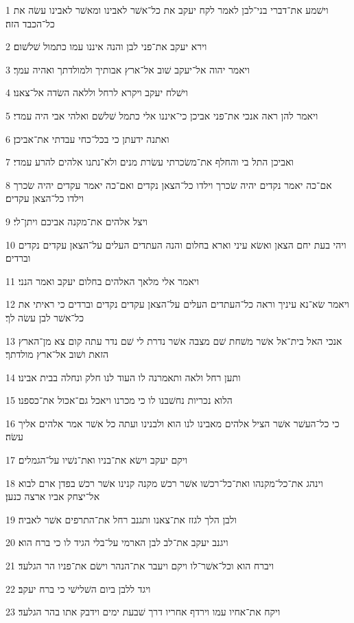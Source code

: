 \par 1 וישׁמע את־דברי בני־לבן לאמר לקח יעקב את כל־אשׁר לאבינו ומאשׁר לאבינו עשׂה את כל־הכבד הזה׃
\par 2 וירא יעקב את־פני לבן והנה איננו עמו כתמול שׁלשׁום׃
\par 3 ויאמר יהוה אל־יעקב שׁוב אל־ארץ אבותיך ולמולדתך ואהיה עמך׃
\par 4 וישׁלח יעקב ויקרא לרחל וללאה השׂדה אל־צאנו׃
\par 5 ויאמר להן ראה אנכי את־פני אביכן כי־איננו אלי כתמל שׁלשׁם ואלהי אבי היה עמדי׃
\par 6 ואתנה ידעתן כי בכל־כחי עבדתי את־אביכן׃
\par 7 ואביכן התל בי והחלף את־משׂכרתי עשׂרת מנים ולא־נתנו אלהים להרע עמדי׃
\par 8 אם־כה יאמר נקדים יהיה שׂכרך וילדו כל־הצאן נקדים ואם־כה יאמר עקדים יהיה שׂכרך וילדו כל־הצאן עקדים׃
\par 9 ויצל אלהים את־מקנה אביכם ויתן־לי׃
\par 10 ויהי בעת יחם הצאן ואשׂא עיני וארא בחלום והנה העתדים העלים על־הצאן עקדים נקדים וברדים׃
\par 11 ויאמר אלי מלאך האלהים בחלום יעקב ואמר הנני׃
\par 12 ויאמר שׂא־נא עיניך וראה כל־העתדים העלים על־הצאן עקדים נקדים וברדים כי ראיתי את כל־אשׁר לבן עשׂה לך׃
\par 13 אנכי האל בית־אל אשׁר משׁחת שׁם מצבה אשׁר נדרת לי שׁם נדר עתה קום צא מן־הארץ הזאת ושׁוב אל־ארץ מולדתך׃
\par 14 ותען רחל ולאה ותאמרנה לו העוד לנו חלק ונחלה בבית אבינו׃
\par 15 הלוא נכריות נחשׁבנו לו כי מכרנו ויאכל גם־אכול את־כספנו׃
\par 16 כי כל־העשׁר אשׁר הציל אלהים מאבינו לנו הוא ולבנינו ועתה כל אשׁר אמר אלהים אליך עשׂה׃
\par 17 ויקם יעקב וישׂא את־בניו ואת־נשׁיו על־הגמלים׃
\par 18 וינהג את־כל־מקנהו ואת־כל־רכשׁו אשׁר רכשׁ מקנה קנינו אשׁר רכשׁ בפדן ארם לבוא אל־יצחק אביו ארצה כנען׃
\par 19 ולבן הלך לגזז את־צאנו ותגנב רחל את־התרפים אשׁר לאביה׃
\par 20 ויגנב יעקב את־לב לבן הארמי על־בלי הגיד לו כי ברח הוא׃
\par 21 ויברח הוא וכל־אשׁר־לו ויקם ויעבר את־הנהר וישׂם את־פניו הר הגלעד׃
\par 22 ויגד ללבן ביום השׁלישׁי כי ברח יעקב׃
\par 23 ויקח את־אחיו עמו וירדף אחריו דרך שׁבעת ימים וידבק אתו בהר הגלעד׃
